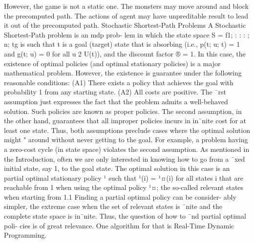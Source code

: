 However, the game is not a static one. The monsters may move around and block the precomputed path. The actions of
agent may have unpreditable result to lead it out of the precomputed path.
Stochastic Shortest-Path Problems
A Stochastic Shortest-Path problem is an mdp prob-
lem in which the state space S = f1; : : : ; n; tg is such
that t is a goal (target) state that is absorbing (i.e.,
p(t; u; t) = 1 and g(t; u) = 0 for all u 2 U(t)), and the
discount factor ® = 1. In this case, the existence of
optimal policies (and optimal stationary policies) is a
major mathematical problem. However, the existence
is guarantee under the following reasonable conditions:
(A1) There exists a policy that achieves the goal with
probability 1 from any starting state.
(A2) All costs are positive.
The ¯rst assumption just expresses the fact that the
problem admits a well-behaved solution. Such policies
are known as proper policies. The second assumption,
in the other hand, guarantees that all improper policies
incurs in in¯nite cost for at least one state. Thus, both
assumptions preclude cases where the optimal solution
might \wander" around without never getting to the
goal. For example, a problem having a zero-cost cycle
(in state space) violates the second assumption.
As mentioned in the Introduction, often we are only
interested in knowing how to go from a ¯xed initial
state, say 1, to the goal state. The optimal solution in
this case is an partial optimal stationary policy ¹ such
that ¹(i) = ¹¤(i) for all states i that are reachable
from 1 when using the optimal policy ¹¤; the so-called
relevant states when starting from 1.1
Finding a partial optimal policy can be consider-
ably simpler, the extreme case when the set of relevant
states is ¯nite and the complete state space is in¯nite.
Thus, the question of how to ¯nd partial optimal poli-
cies is of great relevance. One algorithm for that is
Real-Time Dynamic Programming.

